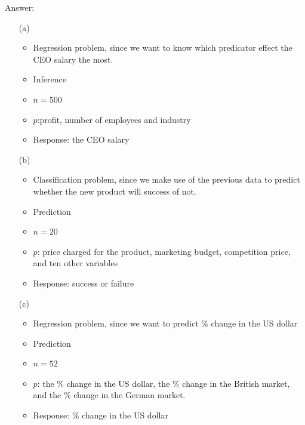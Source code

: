     \documentclass[12pt,fleqn,a4paper]{article}
\theoremstyle{definition}
\theoremstyle{plain}
\begin{document}
\begin{framed}
Answer:
    \begin{enumerate}
        \item[(a)]
            \begin{itemize}
                \item Regression problem, since we want to know which predicator effect the CEO salary the most.
                \item Inference
                \item $n=500$
                \item $p$:profit, number of employees and industry
                \item Response: the CEO salary
            \end{itemize}
        \item[(b)]
            \begin{itemize}
                \item Classification problem, since we make use of the previous data to predict whether the new product will success of not.
                \item Prediction
                \item $n=20$
                \item $p$: price charged for the product, marketing budget, competition price, and ten other variables
                \item Response: success or failure
            \end{itemize}
        \item[(c)]
            \begin{itemize}
                \item Regression problem, since we want to predict \% change in the US dollar
                \item Prediction
                \item $n=52$
                \item $p$: the \% change in the US dollar, the \% change in the British market, and the \% change in the German market.
                \item Response: \% change in the US dollar
            \end{itemize}
    \end{enumerate}
\end{framed}

\end{document}
